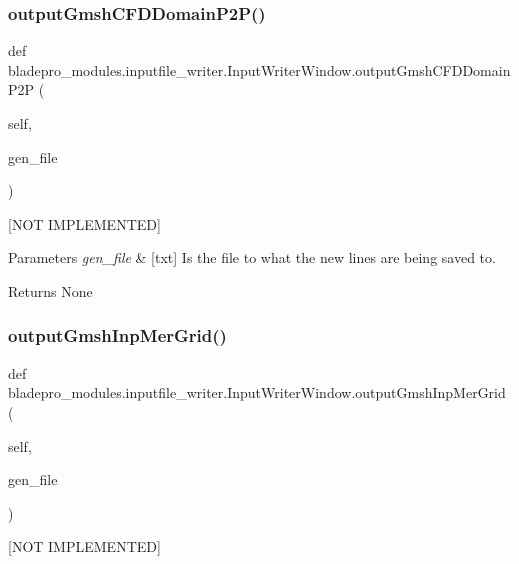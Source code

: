 \subsubsection{\texorpdfstring{output\+Gmsh\+C\+F\+D\+Domain\+P2\+P()}{outputGmshCFDDomainP2P()}}
{\footnotesize\ttfamily def bladepro\+\_\+modules.\+inputfile\+\_\+writer.\+Input\+Writer\+Window.\+output\+Gmsh\+C\+F\+D\+Domain\+P2P (\begin{DoxyParamCaption}\item[{}]{self,  }\item[{}]{gen\+\_\+file }\end{DoxyParamCaption})}



\mbox{[}N\+OT I\+M\+P\+L\+E\+M\+E\+N\+T\+ED\mbox{]} 


\begin{DoxyParams}{Parameters}
{\em gen\+\_\+file} & \mbox{[}txt\mbox{]} Is the file to what the new lines are being saved to. \\
\hline
\end{DoxyParams}
\begin{DoxyReturn}{Returns}
None 
\end{DoxyReturn}
\hypertarget{a00071_a258f943645c60945cbb97494db0ebf52}{}\label{a00071_a258f943645c60945cbb97494db0ebf52} 
\subsubsection{\texorpdfstring{output\+Gmsh\+Inp\+Mer\+Grid()}{outputGmshInpMerGrid()}}
{\footnotesize\ttfamily def bladepro\+\_\+modules.\+inputfile\+\_\+writer.\+Input\+Writer\+Window.\+output\+Gmsh\+Inp\+Mer\+Grid (\begin{DoxyParamCaption}\item[{}]{self,  }\item[{}]{gen\+\_\+file }\end{DoxyParamCaption})}



\mbox{[}N\+OT I\+M\+P\+L\+E\+M\+E\+N\+T\+ED\mbox{]} 



